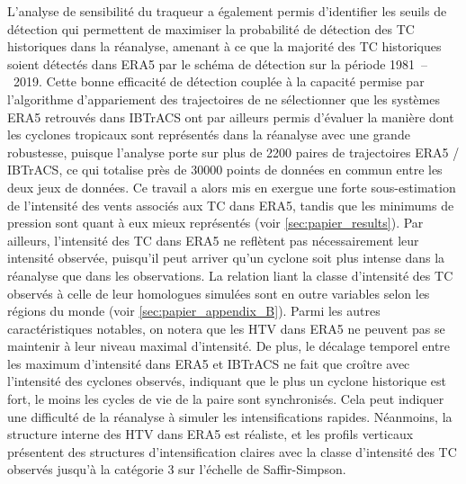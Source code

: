 \documentclass[../main.tex]{subfiles}
\begin{document}
L'analyse de sensibilité du traqueur a également permis d'identifier les seuils de détection qui permettent de maximiser la probabilité de détection des TC
historiques dans la réanalyse, amenant à ce que la majorité des TC historiques soient détectés dans ERA5 par le schéma de détection sur la période
\num{1981}~--~\num{2019}. Cette bonne efficacité de détection couplée à la capacité permise par l'algorithme d'appariement des trajectoires de ne sélectionner
que les systèmes ERA5 retrouvés dans IBTrACS ont par ailleurs permis d'évaluer la manière dont les cyclones tropicaux sont représentés dans la réanalyse avec
une grande robustesse, puisque l'analyse porte sur plus de \num{2200} paires de trajectoires ERA5 / IBTrACS, ce qui totalise près de \num{30000} points de
données en commun entre les deux jeux de données. Ce travail a alors mis en exergue une forte sous-estimation de l'intensité des vents associés aux TC dans
ERA5, tandis que les minimums de pression sont quant à eux mieux représentés (voir \cref{sec:papier_results}). Par ailleurs, l'intensité des TC dans ERA5 ne
reflètent pas nécessairement leur intensité observée, puisqu'il peut arriver qu'un cyclone soit plus intense dans la réanalyse que dans les observations. La
relation liant la classe d'intensité des TC observés à celle de leur homologues simulées sont en outre variables selon les régions du monde (voir
\cref{sec:papier_appendix_B}). Parmi les autres caractéristiques notables, on notera que les HTV dans ERA5 ne peuvent pas se maintenir à leur niveau maximal
d'intensité. De plus, le décalage temporel entre les maximum d'intensité dans ERA5 et IBTrACS ne fait que croître avec l'intensité des cyclones observés,
indiquant que le plus un cyclone historique est fort, le moins les cycles de vie de la paire sont synchronisés. Cela peut indiquer une difficulté de la
réanalyse à simuler les intensifications rapides. Néanmoins, la structure interne des HTV dans ERA5 est réaliste, et les profils verticaux présentent des
structures d'intensification claires avec la classe d'intensité des TC observés jusqu'à la catégorie 3 sur l'échelle de Saffir-Simpson.
\end{document}
